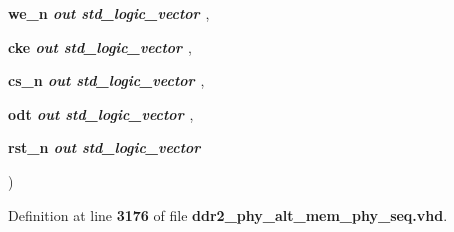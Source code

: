 {\begin{DoxyParamCaption}
\item[{\textcolor{keywordtype}{ } }]{{\bfseries \textcolor{vhdlchar}{we\+\_\+n}\textcolor{vhdlchar}{ }}\textcolor{stringliteral}{} {\em {\bfseries \textcolor{keywordflow}{out}\textcolor{vhdlchar}{ }\textcolor{comment}{std\+\_\+logic\+\_\+vector}\textcolor{vhdlchar}{ }\textcolor{vhdlchar}{ }\textcolor{vhdlchar}{ }}} , }
\item[{\textcolor{keywordtype}{ } }]{{\bfseries \textcolor{vhdlchar}{cke}\textcolor{vhdlchar}{ }}\textcolor{stringliteral}{} {\em {\bfseries \textcolor{keywordflow}{out}\textcolor{vhdlchar}{ }\textcolor{comment}{std\+\_\+logic\+\_\+vector}\textcolor{vhdlchar}{ }\textcolor{vhdlchar}{ }\textcolor{vhdlchar}{ }}} , }
\item[{\textcolor{keywordtype}{ } }]{{\bfseries \textcolor{vhdlchar}{cs\+\_\+n}\textcolor{vhdlchar}{ }}\textcolor{stringliteral}{} {\em {\bfseries \textcolor{keywordflow}{out}\textcolor{vhdlchar}{ }\textcolor{comment}{std\+\_\+logic\+\_\+vector}\textcolor{vhdlchar}{ }\textcolor{vhdlchar}{ }\textcolor{vhdlchar}{ }}} , }
\item[{\textcolor{keywordtype}{ } }]{{\bfseries \textcolor{vhdlchar}{odt}\textcolor{vhdlchar}{ }}\textcolor{stringliteral}{} {\em {\bfseries \textcolor{keywordflow}{out}\textcolor{vhdlchar}{ }\textcolor{comment}{std\+\_\+logic\+\_\+vector}\textcolor{vhdlchar}{ }\textcolor{vhdlchar}{ }\textcolor{vhdlchar}{ }}} , }
\item[{\textcolor{keywordtype}{ } }]{{\bfseries \textcolor{vhdlchar}{rst\+\_\+n}\textcolor{vhdlchar}{ }}\textcolor{stringliteral}{} {\em {\bfseries \textcolor{keywordflow}{out}\textcolor{vhdlchar}{ }\textcolor{comment}{std\+\_\+logic\+\_\+vector}\textcolor{vhdlchar}{ }\textcolor{vhdlchar}{ }\textcolor{vhdlchar}{ }}}}
\end{DoxyParamCaption}
)\hspace{0.3cm}{\ttfamily [Procedure]}}\label{class__ddr2__phy__alt__mem__phy__addr__cmd__pkg_a838d2aea12bb482e39fa74d0d6a4b7d0}


Definition at line {\bf 3176} of file {\bf ddr2\+\_\+phy\+\_\+alt\+\_\+mem\+\_\+phy\+\_\+seq.\+vhd}.

